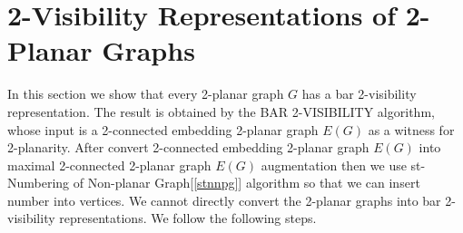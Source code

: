 \section{2-Visibility Representations of 2-Planar Graphs}

In this section we show that every 2-planar graph $G$ has a bar 2-visibility representation. The result is obtained by the BAR 2-VISIBILITY algorithm, whose input is a 2-connected embedding 2-planar graph $E(G)$ as a witness for 2-planarity. After convert 2-connected embedding 2-planar graph $E(G)$ into maximal  2-connected 2-planar graph $E(G)$ augmentation then we use st-Numbering of Non-planar Graph[\ref{stnnpg}] algorithm so that we can insert number into vertices. We cannot directly convert the 2-planar graphs into bar 2-visibility representations. We follow the following steps.


